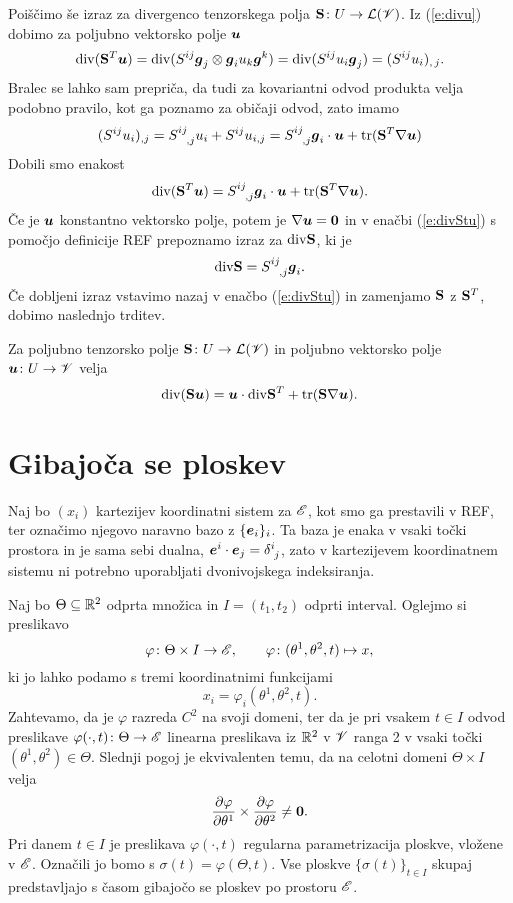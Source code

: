 Poiščimo še izraz za divergenco tenzorskega polja $\mathbf S\colon U\to\mathcal L(\mathscr V)$.
Iz (\ref{e:divu}) dobimo za poljubno vektorsko polje $\boldsymbol u$
\[
	\mathrm{div}(\mathbf S^{T}\boldsymbol u)=\mathrm{div}(S^{ij}\boldsymbol g_j\otimes\boldsymbol g_i u_k\boldsymbol g^k)
	=\mathrm{div}(S^{ij}u_i\boldsymbol g_j)=(S^{ij}u_i)_{,\,j}.
\]
Bralec se lahko sam prepriča, da tudi za kovariantni odvod produkta velja
podobno pravilo, kot ga poznamo za običaji odvod, zato imamo
\[
	(S^{ij}u_i)_{,j}=\topbot{S}{ij}{,j}u_i+S^{ij}u_{i,j}=
	\topbot{S}{ij}{,j}\vek{g}_i\cdot\vek{u}+\tr(\ten{S}^{T}\nabla\vek{u})
\]
Dobili smo enakost
\begin{equation} \label{e:divStu}
	\div(\ten{S}^{T}\vek{u})=\topbot{S}{ij}{,j}\vek{g}_i\cdot\vek{u}+\tr(\ten{S}^{T}\nabla\vek{u}).
\end{equation}
Če je $\boldsymbol u$ konstantno vektorsko polje, potem je $\nabla\boldsymbol u=\mathbf 0$ in v
enačbi (\ref{e:divStu}) s pomočjo definicije REF prepoznamo izraz za $\mathrm{div}\mathbf S$, ki je
\[
	\div\ten{S}=\topbot{S}{ij}{,j}\vek{g}_i.
\]
Če dobljeni izraz vstavimo nazaj v enačbo (\ref{e:divStu}) in zamenjamo $\mathbf S$ z
$\mathbf S^{T}$, dobimo naslednjo trditev.
\begin{trditev} \label{e:divSu}
	Za poljubno tenzorsko polje $\mathbf S\colon U\to\mathcal L(\mathscr V)$ in poljubno
	vektorsko polje $\boldsymbol u\colon U\to\mathscr V$ velja
	\[ \mathrm{div}(\mathbf S\boldsymbol u)=\boldsymbol u\cdot\mathrm{div}\mathbf S^{T}+\mathrm{tr}(\mathbf S\nabla\boldsymbol u). \]
\end{trditev}


\section{Gibajoča se ploskev}


Naj bo $(x_i)$ kartezijev koordinatni sistem za $\mathscr E$, kot smo ga prestavili v REF, ter označimo
njegovo naravno bazo z $\{\boldsymbol e_i\}_i$. Ta baza je enaka v vsaki točki prostora in je sama
sebi dualna, $\vek{e}^i\cdot\vek{e}_j=\topbot{\delta}{i}{j}$, zato v kartezijevem
koordinatnem sistemu ni potrebno uporabljati dvonivojskega indeksiranja.

Naj bo $\Theta\subseteq\mathbb R^2$ odprta množica in $I=(t_1,t_2)$ odprti interval.
Oglejmo si preslikavo
\begin{equation*}
	\varphi\colon\Theta\times I\to\mathscr E,\qquad \varphi\colon(\theta^1,\theta^2,t)\mapsto x,
\end{equation*}
ki jo lahko podamo s tremi koordinatnimi funkcijami
\[
	x_i=\varphi_i(\theta^1,\theta^2,t).
\]
Zahtevamo, da je $\varphi$ razreda $C^2$ na svoji domeni, ter da je pri vsakem $t\in I$ 
odvod preslikave $\varphi(\cdot,t)\colon \Theta\to\mathscr E$ linearna preslikava iz $\mathbb R^2$ v $\mathscr V$ ranga 2 v vsaki
točki $(\theta^1,\theta^2)\in\Theta$. Slednji pogoj je ekvivalenten temu, da na celotni domeni
$\Theta\times I$ velja
\[ \frac{\partial\varphi}{\partial\theta^1}\times\frac{\partial\varphi}{\partial\theta^2}\neq \boldsymbol 0. \]
Pri danem $t\in I$ je preslikava $\varphi(\cdot,t)$ regularna parametrizacija ploskve,
vložene v $\mathscr E$. Označili jo bomo s $\sigma(t)=\varphi(\Theta,t)$. Vse ploskve $\{\sigma(t)\}_{t\in I}$
skupaj predstavljajo s časom gibajočo se ploskev po prostoru $\mathscr E$.

